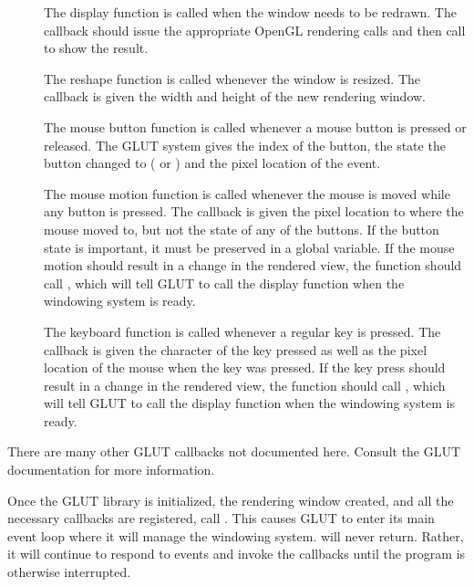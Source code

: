 \begin{description}
\item[] The display function is called when the
  window needs to be redrawn. The callback should issue the appropriate
  OpenGL rendering calls and then call  to show
  the result.
\item[] The reshape function is called whenever
  the window is resized. The callback is given the width and height of the
  new rendering window.
\item[] The mouse button function is called
  whenever a mouse button is pressed or released. The GLUT system gives the
  index of the button, the state the button changed to
  ( or ) and the pixel location of
  the event.
\item[] The mouse motion function is called
  whenever the mouse is moved while any button is pressed. The callback is
  given the pixel location to where the mouse moved to, but not the state
  of any of the buttons. If the button state is important, it must be
  preserved in a global variable. If the mouse motion should result in a
  change in the rendered view, the function should call
  , which will tell GLUT to call the display
  function when the windowing system is ready.
\item[] The keyboard function is called
  whenever a regular key is pressed. The callback is given the character of
  the key pressed as well as the pixel location of the mouse when the key
  was pressed. If the key press should result in a change in the rendered
  view, the function should call , which will
  tell GLUT to call the display function when the windowing system is
  ready.
\end{description}

\begin{didyouknow}
  There are many other GLUT callbacks not documented here. Consult the GLUT
  documentation for more information.
\end{didyouknow}



Once the GLUT library is initialized, the rendering window created, and all
the necessary callbacks are registered, call . This
causes GLUT to enter its main event loop where it will manage the windowing
system.  will never return. Rather, it will continue
to respond to events and invoke the callbacks until the program is
otherwise interrupted.


